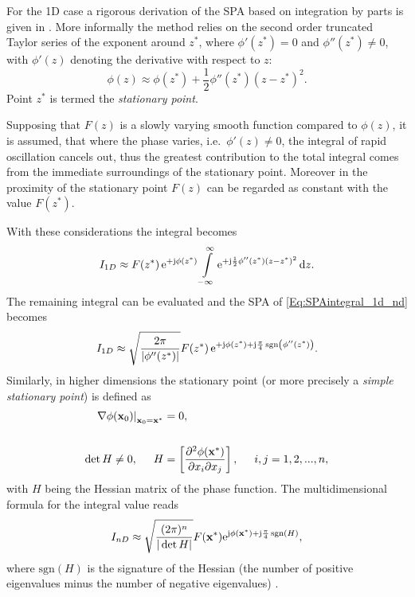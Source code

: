 For the 1D case a rigorous derivation of the SPA based on integration by parts is given in \cite{Bleistein1984, Blenstein1975, Williams1999}.
More informally the method relies on the second order truncated Taylor series of the exponent around $z^*$, where $\phi'(z^*) = 0$ and $\phi''(z^*) \neq 0$, with $\phi'(z)$ denoting the derivative with respect to $z$:
\begin{equation}
\phi(z) \approx \phi(z^*) + \frac{1}{2}\phi''(z^*)(z-z^*)^2.
\end{equation}
Point $z^*$ is termed the \emph{stationary point}.

Supposing that $F(z)$ is a slowly varying smooth function compared to $\phi(z)$, it is assumed, that where the phase varies, i.e.\ $\phi'(z) \neq 0$, the integral of rapid oscillation cancels out, thus the greatest contribution to the total integral comes from the immediate surroundings of the stationary point.
Moreover in the proximity of the stationary point $F(z)$ can be regarded as constant with the value $F(z^*)$.

With these considerations the integral becomes
\begin{align}
I_{1D} \approx F(z^*)\,\mathrm{e}^{+\mathrm{j}\phi(z^*)} 
\int\limits_{-\infty}^{\infty} \mathrm{e}^{+\mathrm{j} \frac{1}{2}\phi''(z^*)(z-z^*)^2} \, \mathrm{d} z.
\end{align}
The remaining integral can be evaluated and the SPA of \eqref{Eq:SPAintegral_1d_nd} becomes \cite[Ch.\ 2.8]{Blenstein1975}
\begin{equation}
\label{Eq:SPAResult}
I_{1D} \approx \sqrt{\frac{2\pi}{| \phi''(z^*) |}} F(z^*) \, \mathrm{e}^{+\mathrm{j} \phi(z^*) + \mathrm{j} \frac{\pi}{4}\,\mathrm{sgn}\left(  \phi''(z^*) \right)}.
\end{equation}
\vspace{3mm}
Similarly, in higher dimensions the stationary point (or more precisely a \emph{simple stationary point}) is defined as
\begin{align}
\label{Eq:ndim_stat_point}
\begin{split}
\left.
\nabla \phi(\vxo)\right|_{\vxo = \vx^*} &= 0,
\\ \vspace{3mm} \\
\det H \neq 0,
\hspace{5mm} 
H &= \left[
\frac{\partial^2 \phi(\vx^*)}{\partial x_i \partial x_j} 
\right],
\hspace{5mm}
i,j = 1,2,...,n,
\end{split}
\end{align}
with $H$ being the Hessian matrix of the phase function.
The multidimensional formula for the integral value reads
\begin{equation}
\label{Eq:SPAResult_nd}
I_{nD} \approx \sqrt{\frac{(2\pi)^n}{|\det H|}} F(\mathbf{x}^*) \mathrm{e}^{\mathrm{j} \phi(\mathbf{x}^*) + \mathrm{j} \frac{\pi}{4}\,\mathrm{sgn}\left( H \right)},
\end{equation}
where $\mathrm{sgn}\left( H \right)$ is the signature of the Hessian (the number of positive eigenvalues minus the number of negative eigenvalues) \cite{Bleistein2000}.


